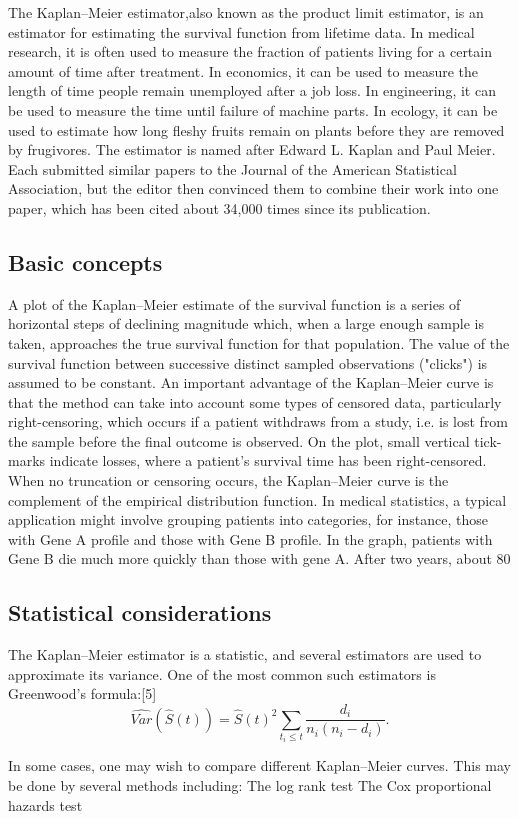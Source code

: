 The Kaplan–Meier estimator,also known as the product limit estimator, is an estimator for estimating the survival function from lifetime data. In medical research, it is often used to measure the fraction of patients living for a certain amount of time after treatment. In economics, it can be used to measure the length of time people remain unemployed after a job loss. In engineering, it can be used to measure the time until failure of machine parts. In ecology, it can be used to estimate how long fleshy fruits remain on plants before they are removed by frugivores. The estimator is named after Edward L. Kaplan and Paul Meier. Each submitted similar papers to the Journal of the American Statistical Association, but the editor then convinced them to combine their work into one 
paper, which has been cited about 34,000 times since its publication.





\subsection*{Basic concepts}
A plot of the Kaplan–Meier estimate of the survival function is a series of horizontal steps of declining magnitude which, when a large enough sample is taken, approaches the true survival function for that population. The value of the survival function between successive distinct sampled observations ("clicks") is assumed to be constant.
An important advantage of the Kaplan–Meier curve is that the method can take into account some types of censored data, particularly right-censoring, which occurs if a patient withdraws from a study, i.e. is lost from the sample before the final outcome is observed. On the plot, small vertical tick-marks indicate losses, where a patient's survival time has been right-censored. When no truncation or censoring occurs, the Kaplan–Meier curve is the complement of the empirical distribution function.
In medical statistics, a typical application might involve grouping patients into categories, for instance, those with Gene A profile and those with Gene B profile. In the graph, patients with Gene B die much more quickly than those with gene A. After two years, about 80%




\subsection*{Statistical considerations}
The Kaplan–Meier estimator is a statistic, and several estimators are used to approximate its variance. One of the most common such estimators is Greenwood's formula:[5]
\[ \widehat{Var}( \widehat S(t) ) = \widehat S(t)^2  \sum\limits_{t_i\le t} {\frac{{d_i}}{{n_i}({n_i-d_i})}}.\]


In some cases, one may wish to compare different Kaplan–Meier curves. This may be done by several methods including:
The log rank test
The Cox proportional hazards test
